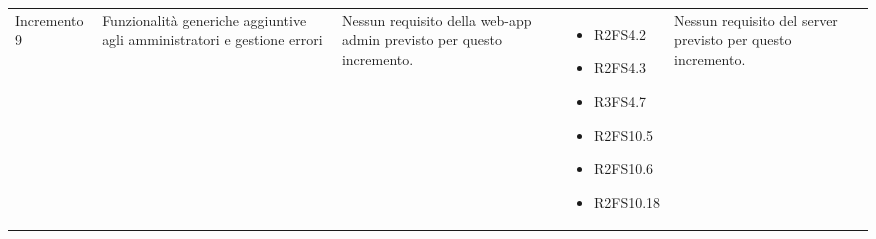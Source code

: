 {\begin{longtable}{C{2.5cm} C{3.2cm} C{2.8cm} C{2.8cm} C{2.8cm}}
Incremento 9 & Funzionalità generiche aggiuntive agli amministratori e gestione errori & 
    Nessun requisito della web-app admin previsto per questo incremento. 
     & \begin{itemize} 
    \item[ ] R2FS4.2
    \item[ ] R2FS4.3
    \item[ ] R3FS4.7
    \item[ ] R2FS10.5
    \item[ ] R2FS10.6
    \item[ ] R2FS10.18
\end{itemize} & 
    Nessun requisito del server previsto per questo incremento. \\

\end{longtable}
}